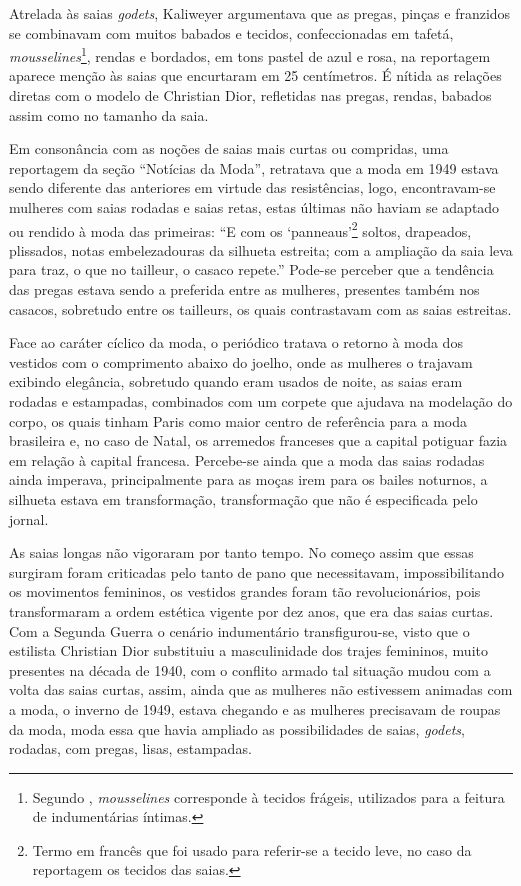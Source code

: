 \begin{refsection}
    Atrelada às saias \textit{godets}, Kaliweyer argumentava que as pregas, pinças e franzidos se combinavam com muitos babados e tecidos, confeccionadas em tafetá, \textit{mousselines}\footnote{Segundo \textcite{MedeirosFl2014Arremedando}, \textit{mousselines} corresponde à tecidos frágeis, utilizados para a feitura de indumentárias íntimas.}, rendas e bordados, em tons pastel de azul e rosa, na reportagem aparece menção às saias que encurtaram em 25 centímetros. É nítida as relações diretas com o modelo de Christian Dior, refletidas nas pregas, rendas, babados assim como no tamanho da saia.

    \nocite{CurtasOuCompridas1948}
    \nocite{NoticiasDaModa1948janeiro}
    \nocite{NoticiasDaModa1948Junho}
    \nocite{DiarioDeNatal1949SemTitulo}

    Em consonância com as noções de saias mais curtas ou compridas, uma reportagem da seção ``Notícias da Moda'', retratava que a moda em 1949 estava sendo diferente das anteriores em virtude das resistências, logo, encontravam-se mulheres com saias rodadas e saias retas, estas últimas não haviam se adaptado ou rendido à moda das primeiras: ``E com os `panneaus'\footnote{Termo em francês que foi usado para referir-se a tecido leve, no caso da reportagem os tecidos das saias.} soltos, drapeados, plissados, notas embelezadouras da silhueta estreita; com a ampliação da saia leva para traz, o que no tailleur, o casaco repete.'' Pode-se perceber que a tendência das pregas estava sendo a preferida entre as mulheres, presentes também nos casacos, sobretudo entre os tailleurs, os quais contrastavam com as saias estreitas. 

    Face ao caráter cíclico da moda, o periódico tratava o retorno à moda dos vestidos com o comprimento abaixo do joelho, onde as mulheres o trajavam exibindo elegância, sobretudo quando eram usados de noite, as saias eram rodadas e estampadas, combinados com um corpete que ajudava na modelação do corpo, os quais tinham Paris como maior centro de referência para a moda brasileira e, no caso de Natal, os arremedos franceses que a capital potiguar fazia em relação à capital francesa. Percebe-se ainda que a moda das saias rodadas ainda imperava, principalmente para as moças irem para os bailes noturnos, a silhueta estava em transformação, transformação que não é especificada pelo jornal. 

    As saias longas não vigoraram por tanto tempo. No começo assim que essas surgiram foram criticadas pelo tanto de pano que necessitavam, impossibilitando os movimentos femininos, os vestidos grandes foram tão revolucionários, pois transformaram a ordem estética vigente por dez anos, que era das saias curtas. Com a Segunda Guerra o cenário indumentário transfigurou-se, visto que o estilista Christian Dior substituiu a masculinidade dos trajes femininos, muito presentes na década de 1940, com o conflito armado tal situação mudou com a volta das saias curtas, assim, ainda que as mulheres não estivessem animadas com a moda, o inverno de 1949, estava chegando e as mulheres precisavam de roupas da moda, moda essa que havia ampliado as possibilidades de saias, \textit{godets}, rodadas, com pregas, lisas, estampadas. 


\end{refsection}
